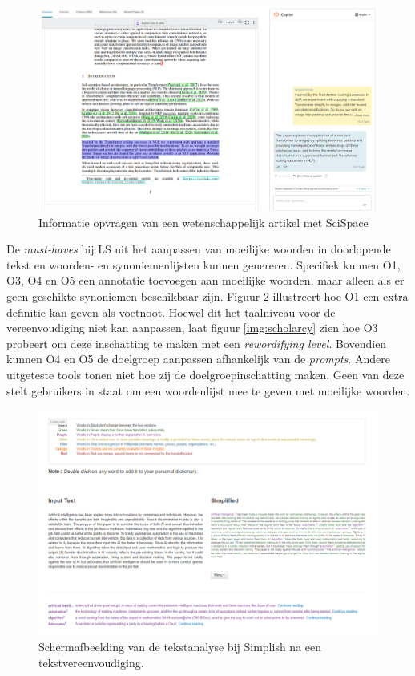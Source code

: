 \begin{figure}[H]
	\includegraphics[width=\linewidth]{img/typeset-example.png}
	\caption{Informatie opvragen van een wetenschappelijk artikel met SciSpace}
	\label{img:scispace-example}
\end{figure}

De \textit{must-haves} bij LS uit het aanpassen van moeilijke woorden in doorlopende tekst en woorden- en synoniemenlijsten kunnen genereren. Specifiek kunnen O1, O3, O4 en O5 een annotatie toevoegen aan moeilijke woorden, maar alleen als er geen geschikte synoniemen beschikbaar zijn. Figuur \ref{img:simplish-output} illustreert hoe O1 een extra definitie kan geven als voetnoot. Hoewel dit het taalniveau voor de vereenvoudiging niet kan aanpassen, laat figuur \ref{img:scholarcy} zien hoe O3 probeert om deze inschatting te maken met een \textit{rewordifying level}. Bovendien kunnen O4 en O5 de doelgroep aanpassen afhankelijk van de \textit{prompts}. Andere uitgeteste tools tonen niet hoe zij de doelgroepinschatting maken. Geen van deze stelt gebruikers in staat om een woordenlijst mee te geven met moeilijke woorden.

\begin{figure}[H]
	\includegraphics[width=\linewidth]{img/simplish-output.png}
	\caption{Schermafbeelding van de tekstanalyse bij Simplish na een tekstvereenvoudiging.}
	\label{img:simplish-output}
\end{figure}

